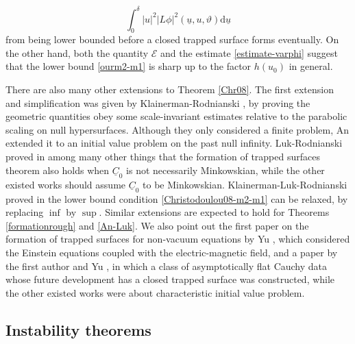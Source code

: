 \documentclass[11pt,reqno]{amsart}
\theoremstyle{definition}
\numberwithin{equation}{section}
\newcommand{\D}{\mathrm{d}}
\def\ub{\underline{u}}
\def\Cb{\underline{C}}
\begin{document}
$$\int_0^\delta|u|^2|L\phi|^2(\ub,u,\vartheta)\D\ub$$ 
from being lower bounded before a closed trapped surface forms eventually. On the other hand, both the quantity $\mathscr{E}$ and the estimate \eqref{estimate-varphi} suggest that the lower bound \eqref{ourm2-m1} is sharp up to the factor $h(u_0)$ in general.

 
There are also many other extensions to Theorem \ref{Chr08}. The first extension and simplification was given by Klainerman-Rodnianski \cite{K-R}, by proving the geometric quantities obey some scale-invariant estimates relative to the parabolic scaling on null hypersurfaces. Although they only considered a finite problem, An \cite{An} extended it to an initial value problem on the past null infinity. Luk-Rodnianski proved in \cite{L-R2} among many other things that the formation of trapped surfaces theorem also holds when $\Cb_0$ is not necessarily Minkowskian, while the other existed works should assume $\Cb_0$ to be Minkowskian. Klainerman-Luk-Rodnianski proved in \cite{K-L-R} the lower bound condition \eqref{Christodoulou08-m2-m1} can be relaxed, by replacing $\inf$ by $\sup$. Similar extensions are expected to hold for Theorems \ref{formationrough} and \ref{An-Luk}. We also point out the first paper on the formation of trapped surfaces for non-vacuum equations by Yu \cite{Yu}, which considered the Einstein equations coupled with the electric-magnetic field, and a paper by the first author and Yu \cite{Li-Yu}, in which a class of asymptotically flat Cauchy data whose future development has a closed trapped surface was constructed, while the other existed works were about characteristic initial value problem.  



\subsection{Instability theorems}\label{instabilitysection}
\end{document}
